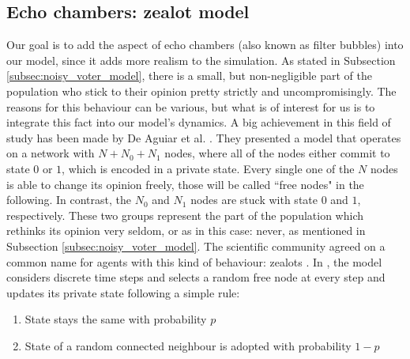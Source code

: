 \documentclass[12pt,a4paper,twoside]{article}
\begin{document}
\subsection{Echo chambers: zealot model}
Our goal is to add the aspect of echo chambers \cite{Nguyen2020} (also known as filter bubbles) into our model, since it adds more realism to the simulation. As stated in Subsection \ref{subsec:noisy_voter_model}, there is a small, but non-negligible part of the population who stick to their opinion pretty strictly and uncompromisingly. The reasons for this behaviour can be various, but what is of interest for us is to integrate this fact into our model's dynamics. A big achievement in this field of study has been made by De Aguiar et al. \cite{Aguiar2011, Chinellato2015, Braha2017}. They presented a model that operates on a network with $N + N_0 + N_1$ nodes, where all of the nodes either commit to state $0$ or $1$, which is encoded in a private state. Every single one of the $N$ nodes is able to change its opinion freely, those will be called ``free nodes" in the following. In contrast, the $N_0$ and $N_1$ nodes are stuck with state $0$ and $1$, respectively. These two groups represent the part of the population which rethinks its opinion very seldom, or as in this case: never, as mentioned in Subsection \ref{subsec:noisy_voter_model}. The scientific community agreed on a common name for agents with this kind of behaviour: zealots \cite{Mobilia2003, Chinellato2015, Braha2017}. In \cite{Chinellato2015}, the model considers discrete time steps and selects a random free node at every step and updates its private state following a simple rule:
\begin{enumerate}\label{rule:chinellato_update}
	\item State stays the same with probability $p$
	\item State of a random connected neighbour is adopted with probability $1-p$
\end{enumerate}
\end{document}
